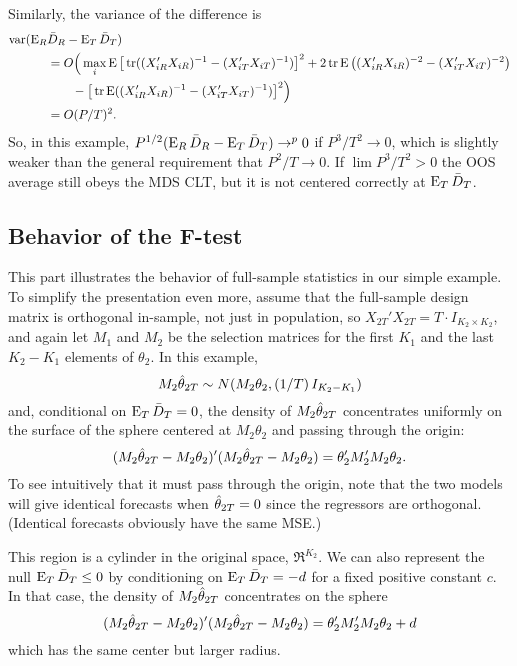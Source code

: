 Similarly, the variance of the difference is
\begin{align*}
  \operatorname{var}(\operatorname{E}_R & \bar{D}_{R} - \operatorname{E}_T \bar{D}_{T}) \\ &=
  O\Big(\max_i \operatorname{E}\big[\operatorname{tr}((X_{iR}'X_{iR})^{-1} - (X_{iT}'X_{iT})^{-1})\big]^2
  + 2 \operatorname{tr} \operatorname{E}\big((X_{iR}'X_{iR})^{-2} - (X_{iT}'X_{iT})^{-2}\big) \\
  &\qquad - \big[\operatorname{tr} \operatorname{E}((X_{iR}'X_{iR})^{-1} - (X_{iT}'X_{iT})^{-1}) \big]^2 \Big)\\
  &= O(P/T)^2.
\end{align*}
So, in this example, $P^{1/2}(\operatorname{E}_R \bar{D}_{R} - \operatorname{E}_T \bar{D}_{T}) \to^p 0$
if $P^3/T^2 \to 0$, which is slightly weaker than the general
requirement that $P^2/T \to 0$.  If $\lim P^3/T^2 > 0$ the OOS average
still obeys the MDS CLT, but it is not centered correctly at $\operatorname{E}_T
\bar{D}_{T}$.

\subsection{Behavior of the F-test}

This part illustrates the behavior of full-sample statistics in our
simple example. To simplify the presentation even more, assume that
the full-sample design matrix is orthogonal in-sample, not just in
population, so $X_{2T}'X_{2T} = T \cdot I_{K_2 \times K_2}$, and again
let $M_1$ and $M_2$ be the selection matrices for the first $K_1$ and
the last $K_2-K_1$ elements of $\theta_2$. In this example,
\begin{equation*}
  M_2 \hat\theta_{2T} \sim
  N(M_2 \theta_2, (1/T) \, I_{K_2-K_1})
\end{equation*}
and, conditional on $\operatorname{E}_T \bar{D}_{T} = 0$, the density of $M_2 \hat\theta_{2T}$
concentrates uniformly on the surface of the sphere centered at $M_2
\theta_2$ and passing through the origin:
\begin{equation*}
  (M_2 \hat\theta_{2T} - M_2 \theta_2)'(M_2 \hat\theta_{2T} - M_2 \theta_2) =
  \theta_2'M_2' M_2 \theta_2.
\end{equation*}
To see intuitively that it must pass through the origin, note that the
two models will give identical forecasts when $\hat\theta_{2T} = 0$ since the
regressors are orthogonal. (Identical forecasts obviously have the
same MSE.)

This region is a cylinder in the original space, $\Re^{K_2}$.  We can
also represent the null $\operatorname{E}_T \bar{D}_{T} \leq 0$ by conditioning on $\operatorname{E}_T
\bar{D}_{T} = -d$ for a fixed positive constant $c$. In that case, the
density of $M_2 \hat\theta_{2T}$ concentrates on the sphere
\begin{equation*}
  (M_2 \hat\theta_{2T} - M_2 \theta_2)'(M_2 \hat\theta_{2T} - M_2 \theta_2) =
  \theta_2'M_2' M_2 \theta_2 + d
\end{equation*}
which has the same center but larger radius.

